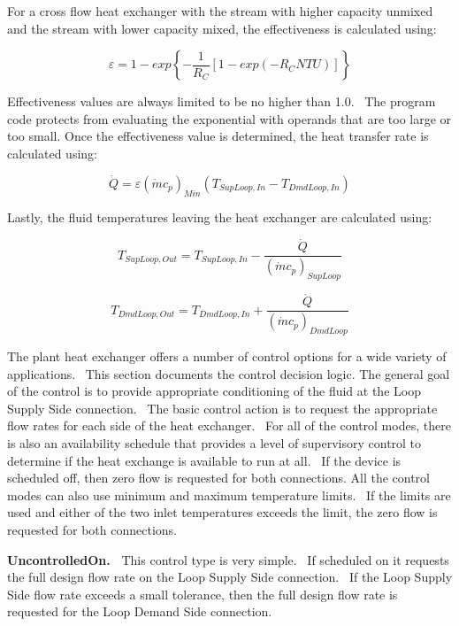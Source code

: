 For a cross flow heat exchanger with the stream with higher capacity unmixed and the stream with lower capacity mixed, the effectiveness is calculated using:

\begin{equation}
\varepsilon  = 1 - exp\left\{ { - \frac{1}{{{R_C}}}\left[ {1 - exp\left( { - {R_C}NTU} \right)} \right]} \right\}
\end{equation}

Effectiveness values are always limited to be no higher than 1.0.~ The program code protects from evaluating the exponential with operands that are too large or too small. Once the effectiveness value is determined, the heat transfer rate is calculated using:

\begin{equation}
\dot Q = \varepsilon {\left( {\dot m{c_p}} \right)_{Min}}\left( {{T_{SupLoop,In}} - {T_{DmdLoop,In}}} \right)
\end{equation}

Lastly, the fluid temperatures leaving the heat exchanger are calculated using:

\begin{equation}
{T_{SupLoop,Out}} = {T_{SupLoop,In}} - \frac{{\dot Q}}{{{{\left( {\dot m{c_p}} \right)}_{SupLoop}}}}
\end{equation}

\begin{equation}
{T_{DmdLoop,Out}} = {T_{DmdLoop,In}} + \frac{{\dot Q}}{{{{\left( {\dot m{c_p}} \right)}_{DmdLoop}}}}
\end{equation}

The plant heat exchanger offers a number of control options for a wide variety of applications.~ This section documents the control decision logic. The general goal of the control is to provide appropriate conditioning of the fluid at the Loop Supply Side connection. ~The basic control action is to request the appropriate flow rates for each side of the heat exchanger.~ For all of the control modes, there is also an availability schedule that provides a level of supervisory control to determine if the heat exchange is available to run at all.~ If the device is scheduled off, then zero flow is requested for both connections. All the control modes can also use minimum and maximum temperature limits.~ If the limits are used and either of the two inlet temperatures exceeds the limit, the zero flow is requested for both connections.

\textbf{UncontrolledOn.~} This control type is very simple.~ If scheduled on it requests the full design flow rate on the Loop Supply Side connection.~ If the Loop Supply Side flow rate exceeds a small tolerance, then the full design flow rate is requested for the Loop Demand Side connection.

